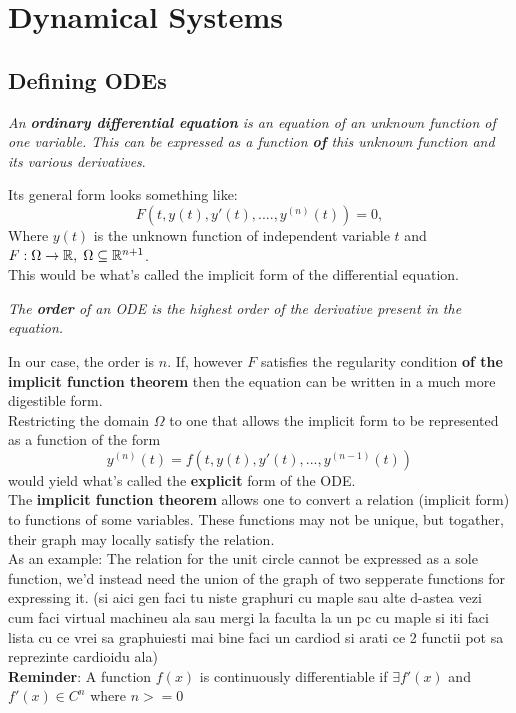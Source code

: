 \chapter{Dynamical Systems}
\label{chap:ch3}


\section{Defining ODEs}
\begin{definition}
    \textit{An \textbf{ordinary differential equation} is an equation of an unknown function of one variable. This can be expressed as a function \textbf{of} this unknown function and its various derivatives}.
\end{definition}
Its general form looks something like:
\begin{equation}\label{eq:3.1.1}
    F(t,y(t),y'(t),....,y^{(n)}(t))=0,
\end{equation}
Where $y(t)$ is the unknown function of independent variable $t$ and $F : \Omega \rightarrow \mathbb{R},\hspace{0.1cm}\Omega \subseteq \mathbb{R}^{n+1}$. \\
This would be what's called the implicit form of the differential equation.

\begin{definition}
    \textit{The \textbf{order} of an ODE is the highest order of the derivative present in the equation.}
\end{definition}
In our case, the order is $n$.
If, however $F$ satisfies the regularity condition \textbf{of the implicit function theorem} then the equation can be written in a much more digestible form. \\
Restricting the domain $\Omega$ to one that allows the implicit form to be represented as a function of the form
$$
    y^{(n)}(t)=f(t,y(t),y'(t),...,y^{(n-1)}(t))
$$
would yield what's called the \textbf{explicit} form of the ODE. \\

The \textbf{implicit function theorem} allows one to convert a relation (implicit form) to functions of some variables. These functions may not be unique, but togather, their graph may locally satisfy the relation. \\
As an example: The relation for the unit circle cannot be expressed as a sole function, we'd instead need the union of the graph of two sepperate functions for expressing it.
(si aici gen faci tu niste graphuri cu maple sau alte d-astea vezi cum faci virtual machineu ala sau mergi la faculta la un pc cu maple si iti faci lista cu ce vrei sa graphuiesti mai bine faci un cardiod si arati ce 2 functii pot sa reprezinte cardioidu ala) \\
\textbf{Reminder}: A function $f(x)$ is continuously differentiable if $\exists f'(x)$ and $f'(x) \in C^n$ where $n>=0$


